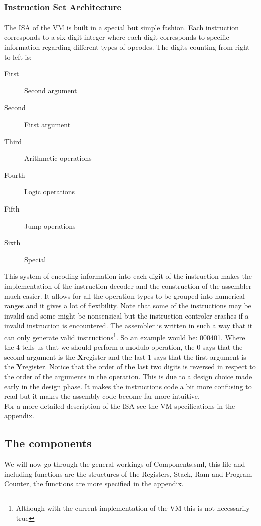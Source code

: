 \documentclass{article}
\newcommand{\x}{$\textbf{X}$}
\newcommand{\y}{$\textbf{Y}$}
\begin{document}
\subsubsection{Instruction Set Architecture}
The ISA\textsuperscript{\cite{ISA}} of the VM is built in a special but simple
fashion. Each instruction corresponds to a six digit integer
where each digit corresponds to specific information regarding different types
of opcodes. The digits counting from right to left is:

\begin{description}
  \item[First] Second argument
  \item[Second] First argument
  \item[Third] Arithmetic operations
  \item[Fourth] Logic operations
  \item[Fifth] Jump operations
  \item[Sixth] Special
\end{description}
This system of encoding information into each digit of the instruction makes the
implementation of the instruction decoder and the construction of the assembler
much easier.
It allows for all the operation types to be grouped into numerical ranges and it
gives  a lot of flexibility. Note that some of the instructions may be invalid
and some might be nonsensical but the instruction controler crashes if a invalid
instruction is encountered. The assembler is written in such a way that it can
only generate valid instructions\footnote{Although with the current
implementation of  the VM this is not necessarily true}.
So an example would be:
000401.
Where the 4 tells us that we should perform a modulo operation,
the 0 says that the second argument is the \x register and the last 1 says
that the first argument is the \y register. Notice that the order of
the last two digits is reversed in respect to the order of the arguments in
the operation.
This is due to a design choice made early in the design phase. It makes the
instructions code a bit more confusing to read but it makes the assembly code
become far more intuitive.\\
For a more detailed description of the ISA see the VM specifications in the
appendix.

\subsection{The components}
We will now go through the general workings of Components.sml, this file and
including functions are the structures of the Registers, Stack, Ram and Program
Counter, the functions are more specified in the appendix.
\end{document}
